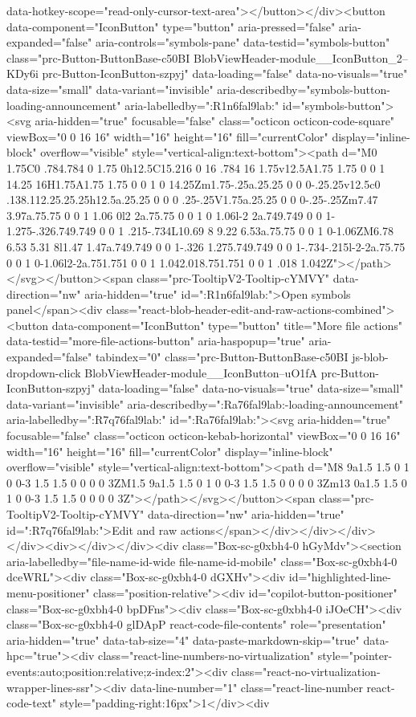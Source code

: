 {{{{{{{{{{{{{{{{{{{{{{{{{{{{{data-hotkey-scope="read-only-cursor-text-area"></button></div><button data-component="IconButton" type="button" aria-pressed="false" aria-expanded="false" aria-controls="symbols-pane" data-testid="symbols-button" class="prc-Button-ButtonBase-c50BI BlobViewHeader-module__IconButton_2--KDy6i prc-Button-IconButton-szpyj" data-loading="false" data-no-visuals="true" data-size="small" data-variant="invisible" aria-describedby="symbols-button-loading-announcement" aria-labelledby=":R1n6fal9lab:" id="symbols-button"><svg aria-hidden="true" focusable="false" class="octicon octicon-code-square" viewBox="0 0 16 16" width="16" height="16" fill="currentColor" display="inline-block" overflow="visible" style="vertical-align:text-bottom"><path d="M0 1.75C0 .784.784 0 1.75 0h12.5C15.216 0 16 .784 16 1.75v12.5A1.75 1.75 0 0 1 14.25 16H1.75A1.75 1.75 0 0 1 0 14.25Zm1.75-.25a.25.25 0 0 0-.25.25v12.5c0 .138.112.25.25.25h12.5a.25.25 0 0 0 .25-.25V1.75a.25.25 0 0 0-.25-.25Zm7.47 3.97a.75.75 0 0 1 1.06 0l2 2a.75.75 0 0 1 0 1.06l-2 2a.749.749 0 0 1-1.275-.326.749.749 0 0 1 .215-.734L10.69 8 9.22 6.53a.75.75 0 0 1 0-1.06ZM6.78 6.53 5.31 8l1.47 1.47a.749.749 0 0 1-.326 1.275.749.749 0 0 1-.734-.215l-2-2a.75.75 0 0 1 0-1.06l2-2a.751.751 0 0 1 1.042.018.751.751 0 0 1 .018 1.042Z"></path></svg></button><span class="prc-TooltipV2-Tooltip-cYMVY" data-direction="nw" aria-hidden="true" id=":R1n6fal9lab:">Open symbols panel</span><div class="react-blob-header-edit-and-raw-actions-combined"><button data-component="IconButton" type="button" title="More file actions" data-testid="more-file-actions-button" aria-haspopup="true" aria-expanded="false" tabindex="0" class="prc-Button-ButtonBase-c50BI js-blob-dropdown-click BlobViewHeader-module__IconButton--uO1fA prc-Button-IconButton-szpyj" data-loading="false" data-no-visuals="true" data-size="small" data-variant="invisible" aria-describedby=":Ra76fal9lab:-loading-announcement" aria-labelledby=":R7q76fal9lab:" id=":Ra76fal9lab:"><svg aria-hidden="true" focusable="false" class="octicon octicon-kebab-horizontal" viewBox="0 0 16 16" width="16" height="16" fill="currentColor" display="inline-block" overflow="visible" style="vertical-align:text-bottom"><path d="M8 9a1.5 1.5 0 1 0 0-3 1.5 1.5 0 0 0 0 3ZM1.5 9a1.5 1.5 0 1 0 0-3 1.5 1.5 0 0 0 0 3Zm13 0a1.5 1.5 0 1 0 0-3 1.5 1.5 0 0 0 0 3Z"></path></svg></button><span class="prc-TooltipV2-Tooltip-cYMVY" data-direction="nw" aria-hidden="true" id=":R7q76fal9lab:">Edit and raw actions</span></div></div></div></div><div></div></div><div class="Box-sc-g0xbh4-0 hGyMdv"><section aria-labelledby="file-name-id-wide file-name-id-mobile" class="Box-sc-g0xbh4-0 dceWRL"><div class="Box-sc-g0xbh4-0 dGXHv"><div id="highlighted-line-menu-positioner" class="position-relative"><div id="copilot-button-positioner" class="Box-sc-g0xbh4-0 bpDFns"><div class="Box-sc-g0xbh4-0 iJOeCH"><div class="Box-sc-g0xbh4-0 glDApP react-code-file-contents" role="presentation" aria-hidden="true" data-tab-size="4" data-paste-markdown-skip="true" data-hpc="true"><div class="react-line-numbers-no-virtualization" style="pointer-events:auto;position:relative;z-index:2"><div class="react-no-virtualization-wrapper-lines-ssr"><div data-line-number="1" class="react-line-number react-code-text" style="padding-right:16px">1</div><div }}}}}}}}}}}}}}}}}}}}}}}}}}}}}
